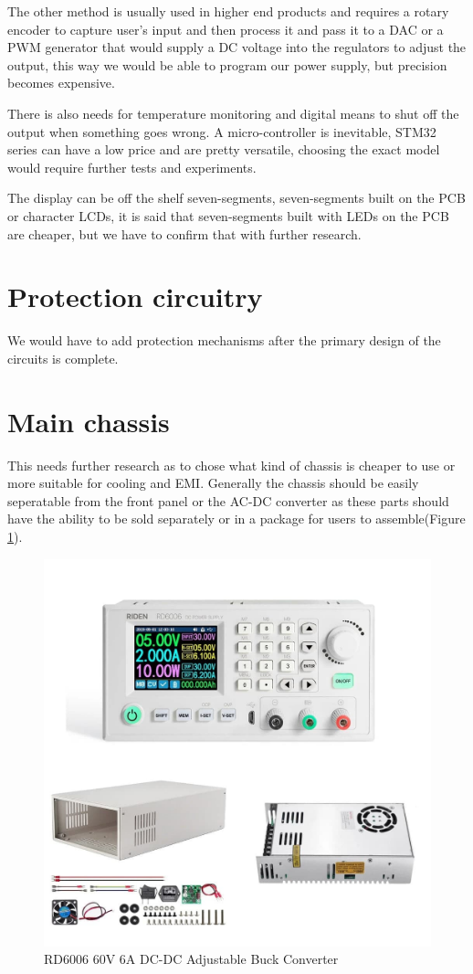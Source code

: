 \documentclass[a4paper, twocolumn]{article}
\begin{document}
	The other method is usually used in higher end products and requires a rotary encoder to capture user's input and then process it and pass it to a DAC or a PWM generator that would supply a DC voltage into the regulators to adjust the output, this way we would be able to program our power supply, but precision becomes expensive.
	
	There is also needs for temperature monitoring and digital means to shut off the output when something goes wrong. A micro-controller is inevitable, STM32 series can have a low price and are pretty versatile, choosing the exact model would require further tests and experiments.
	
	The display can be off the shelf seven-segments, seven-segments built on the PCB or character LCDs, it is said that seven-segments built with LEDs on the PCB are cheaper, but we have to confirm that with further research.
		
\section{Protection circuitry}
	We would have to add protection mechanisms after the primary design of the circuits is complete.
\section{Main chassis}
	This needs further research as to chose what kind of chassis is cheaper to use or more suitable for cooling and EMI. Generally the chassis should be easily seperatable from the front panel or the AC-DC converter as these parts should have the ability to be sold separately or in a package for users to assemble(Figure \ref{fig:case}).
	\begin{figure}
		\includegraphics[width=\linewidth]{case.jpg}
		\caption{RD6006 60V 6A DC-DC Adjustable Buck Converter}
		\label{fig:case}
	\end{figure}
	
\end{document}
